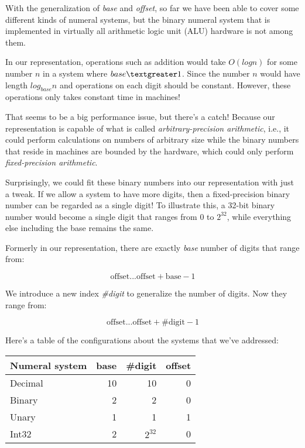 \documentclass[12pt, a4paper]{article}
\begin{document}
With the generalization of \textit{base} and \textit{offset}, so far we have been
able to cover some different kinds of numeral systems, but the binary numeral
system that is implemented in virtually all arithmetic logic unit (ALU) hardware
is not among them.

In our representation, operations such as addition would take $ O(log{}n)$ for some
number $ n $ in a system where $ base \textgreater 1 $. Since the number $ n $
would have length $ log_{base} n $ and operations on each digit should be constant.
However, these operations only takes constant time in machines!

That seems to be a big performance issue, but there's a catch! Because our
representation is capable of what is called \textit{arbitrary-precision arithmetic},
i.e., it could perform calculations on numbers of arbitrary size while the binary
numbers that reside in machines are bounded by the hardware, which could only
perform \textit{fixed-precision arithmetic}.

Surprisingly, we could fit these binary numbers into our representation with
just a tweak. If we allow a system to have more digits, then a fixed-precision
binary number can be regarded as a single digit! To illustrate this, a 32-bit
binary number would become a single digit that ranges from $ 0 $ to $ 2^{32} $,
while everything else including the base remains the same.

Formerly in our representation, there are exactly \textit{base} number of digits
that range from:

$$
    \text{offset}  ...  \text{offset} + \text{base} - 1
$$

We introduce a new index \textit{\#digit} to generalize the number of digits.
Now they range from:

$$
    \text{offset}  ...  \text{offset} + \text{\#digit} - 1
$$

Here's a table of the configurations about the systems that we've addressed:

\begin{center}
    \begin{tabular}{l*{3}{r}}
    Numeral system      & base  & \#digit    & offset    \\
    \hline
    Decimal             & 10    & 10        & 0         \\
    Binary              & 2     & 2         & 0         \\
    Unary               & 1     & 1         & 1         \\
    Int32               & 2     & $ 2^{32} $ & 0        \\
    \end{tabular}
\end{center}
\end{document}
